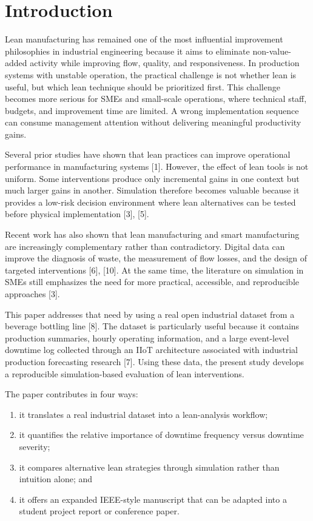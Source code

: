\documentclass[journal]{IEEEtran}
\begin{document}
\section{Introduction}
Lean manufacturing has remained one of the most influential improvement philosophies in industrial engineering because it aims to eliminate non-value-added activity while improving flow, quality, and responsiveness. In production systems with unstable operation, the practical challenge is not whether lean is useful, but which lean technique should be prioritized first. This challenge becomes more serious for SMEs and small-scale operations, where technical staff, budgets, and improvement time are limited. A wrong implementation sequence can consume management attention without delivering meaningful productivity gains.

Several prior studies have shown that lean practices can improve operational performance in manufacturing systems [1]. However, the effect of lean tools is not uniform. Some interventions produce only incremental gains in one context but much larger gains in another. Simulation therefore becomes valuable because it provides a low-risk decision environment where lean alternatives can be tested before physical implementation [3], [5].

Recent work has also shown that lean manufacturing and smart manufacturing are increasingly complementary rather than contradictory. Digital data can improve the diagnosis of waste, the measurement of flow losses, and the design of targeted interventions [6], [10]. At the same time, the literature on simulation in SMEs still emphasizes the need for more practical, accessible, and reproducible approaches [3].

This paper addresses that need by using a real open industrial dataset from a beverage bottling line [8]. The dataset is particularly useful because it contains production summaries, hourly operating information, and a large event-level downtime log collected through an IIoT architecture associated with industrial production forecasting research [7]. Using these data, the present study develops a reproducible simulation-based evaluation of lean interventions.

The paper contributes in four ways:
\begin{enumerate}
    \item it translates a real industrial dataset into a lean-analysis workflow;
    \item it quantifies the relative importance of downtime frequency versus downtime severity;
    \item it compares alternative lean strategies through simulation rather than intuition alone; and
    \item it offers an expanded IEEE-style manuscript that can be adapted into a student project report or conference paper.
\end{enumerate}
\end{document}
